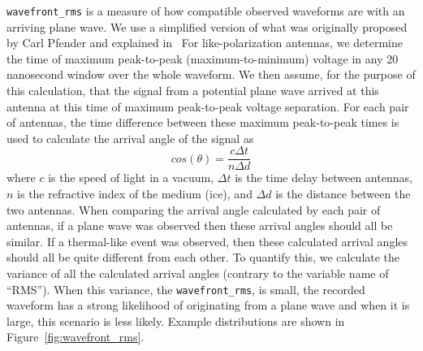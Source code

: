   \texttt{wavefront\_rms} is a measure of how compatible observed waveforms are with an arriving plane wave. 
  We use a simplified version of what was originally proposed by Carl Pfender and explained in~\citep{thesis_clark}
  For like-polarization antennas, we determine the time of maximum peak-to-peak (maximum-to-minimum) voltage in any 20 nanosecond window over the whole waveform.
  We then assume, for the purpose of this calculation, that the signal from a potential plane wave arrived at this antenna at this time of maximum peak-to-peak voltage separation.
  For each pair of antennas, the time difference between these maximum peak-to-peak times is used to calculate the arrival angle of the signal as
  \begin{equation}
    cos(\theta) = \frac{c \Delta t}{n \Delta d}
    \label{eq:wavefrontrms}
  \end{equation}
  where $c$ is the speed of light in a vacuum, $\Delta t$ is the time delay between antennas, $n$ is the refractive index of the medium (ice), and $\Delta d$ is the distance between the two antennas. 
  When comparing the arrival angle calculated by each pair of antennas, if a plane wave was observed then these arrival angles should all be similar. 
  If a thermal-like event was observed, then these calculated arrival angles should all be quite different from each other. 
  To quantify this, we calculate the variance of all the calculated arrival angles (contrary to the variable name of ``RMS'').
  When this variance, the \texttt{wavefront\_rms}, is small, the recorded waveform has a strong likelihood of originating from a plane wave and when it is large, this scenario is less likely.
  Example distributions are shown in Figure~\ref{fig:wavefront_rms}.
    
